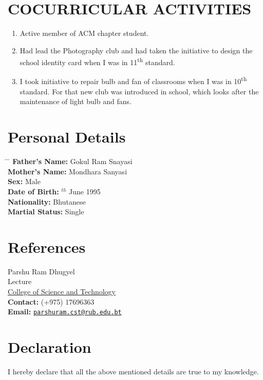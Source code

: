 \documentclass[10pt]{article}
\begin{document}
	\section{COCURRICULAR ACTIVITIES}
	\begin{enumerate}
		\item  {Active member of ACM chapter student.}
		\item  {Had lead the Photography club and had taken the initiative to design the school identity card when I was in 11\textsuperscript{th} standard.}
		\item  {I took initiative to repair bulb and fan of classrooms when I was in 10\textsuperscript{th} standard. For that new club was introduced in school, which looks after the maintenance of light bulb and fans.}
	\end{enumerate}

	\section{Personal Details}
	\begin{tabbing} 
		\hspace{4cm} \= \hspace{10cm} \= \kill
		{\bf Father's Name: } \> Gokul Ram Snayasi\\
		{\bf Mother's Name:  } \> Mondhara Sanyasi\\
		{\bf Sex: } \> Male\\
		{\bf Date of Birth: } $^{th}$ June 1995 \\
		{\bf Nationality:  }\> Bhutanese\\
		{\bf Martial Status: }\> Single\\
	\end{tabbing}	

	\section{References}
	Parshu Ram Dhugyel\\
	Lecture\\
	\href{http://cst.edu.bt/}{ College of Science and Technology} \\
	{\bf Contact: } (+975) 17696363\\
	{\bf Email: } \href{mailto:parshuram.cst@rub.edu.bt}{\tt parshuram.cst@rub.edu.bt} \\

	\section{Declaration}
	I hereby declare that all the above mentioned details are true to my knowledge.\\ \\
	
\end{document}

